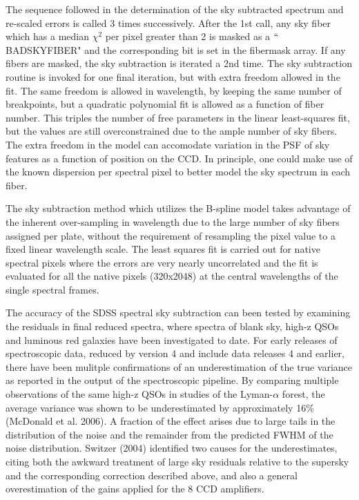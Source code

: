 \documentclass[12pt,preprint]{aastex}
\begin{document}
The sequence followed in the determination of the sky subtracted spectrum
and re-scaled errors is called 3 times successively.  After the 1st call,
any sky fiber which has a median $\chi^2$ per pixel greater than 2 is 
masked as a $``$BADSKYFIBER" and the corresponding bit is set in the fibermask
array.  If any fibers are masked, the sky subtraction is iterated a 2nd time.
The sky subtraction routine is invoked for one final iteration, but with extra 
freedom allowed in the fit.  The same freedom is allowed in wavelength, by
keeping the same number of breakpoints, but a quadratic polynomial fit is
allowed as a function of fiber number.  This triples the number of free 
parameters in the linear least-squares fit, but the values are still 
overconstrained due to the ample number of sky fibers.  The extra freedom
in the model can accomodate variation in the PSF of sky features as a function 
of position on the CCD.  In principle, one could make use of the known 
dispersion per spectral pixel to better model the sky spectrum
in each fiber.

The sky subtraction method which utilizes the B-spline model takes advantage 
of the inherent over-sampling in wavelength due to the large number of 
sky fibers assigned per plate, without the requirement of resampling the 
pixel value to a fixed linear wavelength scale.  The least squares fit
is carried out for native spectral pixels where the errors are very nearly 
uncorrelated and the fit is evaluated for all the native pixels (320x2048)  
at the central wavelengths of the single spectral frames.
    
The accuracy of the SDSS spectral sky subtraction can been tested by examining
the residuals in final reduced spectra, where spectra of blank sky, high-z QSOs
and luminous red galaxies have been investigated to date.
For early releases of spectroscopic data, reduced by version 4 and include
data releases 4 and earlier, there have been mulitple confirmations of an
underestimation of the true variance as reported in the output of the 
spectroscopic pipeline.  By comparing multiple observations of the same
high-z QSOs in studies of the Lyman-$\alpha$ forest, the average variance was
shown to be underestimated by approximately 16\% (McDonald et al. 2006).  
A fraction of the effect arises due to large tails in the distribution 
of the noise and the remainder from the predicted FWHM of the noise 
distribution.  Switzer (2004) identified two causes for the underestimates,
citing both the awkward treatment of large sky residuals relative to the
supersky and the corresponding correction described above, and also a general
overestimation of the gains applied for the 8 CCD amplifiers. 
\end{document}
